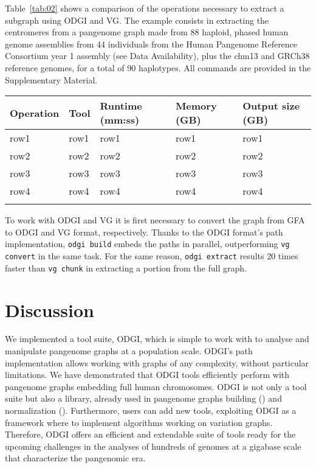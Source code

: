\documentclass{bioinfo}
\begin{document}
    Table~\ref{tab:02} shows a comparison of the operations necessary to extract a subgraph using ODGI and VG. The
    example consists in extracting the centromeres from a pangenome graph made from 88 haploid, phased human genome
    assemblies from 44 individuals from the Human Pangenome Reference Consortium year 1 assembly (see Data
    Availability), plus the chm13 and GRCh38 reference genomes, for a total of 90 haplotypes. All commands are provided
    in the Supplementary Material.

    \begin{table}[!t]
         {
            \begin{tabular}{@{}lllll@{}}
                \toprule Operation & Tool & Runtime (mm:ss) & Memory (GB) & Output size (GB) \\
                \midrule
                row1               & row1 & row1            & row1        & row1             \\
                row2               & row2 & row2            & row2        & row2             \\
                row3               & row3 & row3            & row3        & row3             \\
                row4               & row4 & row4            & row4        & row4             \\
                \botrule
            \end{tabular}}

    \end{table}

    To work with ODGI and VG it is first necessary to convert the graph from GFA to ODGI and VG format, respectively.
    Thanks to the ODGI format's path implementation, \texttt{odgi build} embeds the paths in parallel, outperforming
    \texttt{vg convert} in the same task. For the same reason, \texttt{odgi extract} results 20 times faster than
    \texttt{vg chunk} in extracting a portion from the full graph.


    \section{Discussion}
    We implemented a tool suite, ODGI, which is simple to work with to analyse and manipulate pangenome graphs at a
    population scale. ODGI's path implementation allows working with graphs of any complexity, without particular
    limitations. We have demonstrated that ODGI tools efficiently perform with pangenome graphs embedding full human
    chromosomes. ODGI is not only a tool suite but also a library, already used in pangenome graphs building
    (\citep{pggb}) and normalization (\citep{smoothxg}). Furthermore, users can add new tools, exploiting ODGI as a
    framework where to implement algorithms working on variation graphs. Therefore, ODGI offers an efficient and
    extendable suite of tools ready for the upcoming challenges in the analyses of hundreds of genomes at a gigabase
    scale that characterize the pangenomic era.
\end{document}
